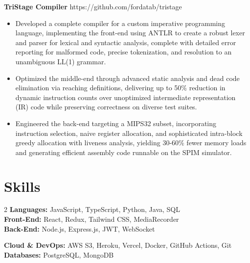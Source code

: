 \documentclass[11pt]{article}       %
\begin{document}
\textbf{TriStage Compiler} \hfill {https://github.com/fordatab/tristage} \
\vspace{-10pt}
\begin{itemize}
\item Developed a complete compiler for a custom imperative programming language, implementing the front-end using ANTLR to create a robust lexer and parser for lexical and syntactic analysis, complete with detailed error reporting for malformed code, precise tokenization, and resolution to an unambiguous LL(1) grammar.
\item Optimized the middle-end through advanced static analysis and dead code elimination via reaching definitions, delivering up to 50\% reduction in dynamic instruction counts over unoptimized intermediate representation (IR) code while preserving correctness on diverse test suites.
\item Engineered the back-end targeting a MIPS32 subset, incorporating instruction selection, naive register allocation, and sophisticated intra-block greedy allocation with liveness analysis, yielding 30-60\% fewer memory loads and generating efficient assembly code runnable on the SPIM simulator. 
\end{itemize}



\vspace{-18.5pt}

\section*{Skills}
\noindent\begin{minipage}{\textwidth}


\begin{multicols}{2}
    \noindent\textbf{Languages:} JavaScript, TypeScript, Python, Java, SQL \\
    \textbf{Front-End:} React, Redux, Tailwind CSS, MediaRecorder  \\
    \textbf{Back-End:} Node.js, Express.js, JWT, WebSocket
    
    \columnbreak %
    
    \noindent\textbf{Cloud \& DevOps:} AWS S3, Heroku, Vercel, Docker, GitHub Actions, Git \\
    \textbf{Databases:} PostgreSQL, MongoDB
\end{multicols}
\end{minipage}
\end{document}
